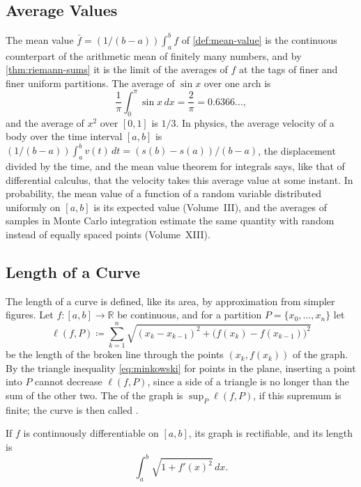 \subsection{Average Values}

The mean value $\bar f=(1/(b-a))\int_a^bf$ of \cref{def:mean-value} is the continuous counterpart of the arithmetic mean of finitely many numbers, and by \cref{thm:riemann-sums} it is the limit of the averages of $f$ at the tags of finer and finer uniform partitions. The average of $\sin x$ over one arch is
\[
\frac1\pi\int_0^\pi\sin x\,dx=\frac2\pi=0.6366\ldots ,
\]
and the average of $x^2$ over $[0,1]$ is $1/3$. In physics, the average velocity of a body over the time interval $[a,b]$ is $(1/(b-a))\int_a^bv(t)\,dt=(s(b)-s(a))/(b-a)$, the displacement divided by the time, and the mean value theorem for integrals says, like that of differential calculus, that the velocity takes this average value at some instant. In probability, the mean value of a function of a random variable distributed uniformly on $[a,b]$ is its expected value (Volume~III), and the averages of samples in Monte Carlo integration estimate the same quantity with random instead of equally spaced points (Volume~XIII).

\subsection{Length of a Curve}

The length of a curve is defined, like its area, by approximation from simpler figures. Let $f\colon[a,b]\to\mathbb R$ be continuous, and for a partition $P=\{x_0,\ldots,x_n\}$ let
\[
\ell(f,P)\coloneqq\sum_{k=1}^n\sqrt{(x_k-x_{k-1})^2+\bigl(f(x_k)-f(x_{k-1})\bigr)^2}
\]
be the length of the broken line through the points $(x_k,f(x_k))$ of the graph. By the triangle inequality \eqref{eq:minkowski} for points in the plane, inserting a point into $P$ cannot decrease $\ell(f,P)$, since a side of a triangle is no longer than the sum of the other two. The  of the graph is $\sup_P\ell(f,P)$, if this supremum is finite; the curve is then called .

\begin{theorem}
\label{thm:arc-length}
If $f$ is continuously differentiable on $[a,b]$, its graph is rectifiable, and its length is
\[
\int_a^b\sqrt{1+f'(x)^2}\,dx .
\]
\end{theorem}

